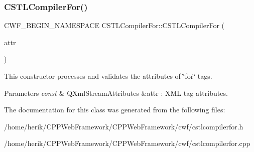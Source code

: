 \subsubsection{\texorpdfstring{C\+S\+T\+L\+Compiler\+For()}{CSTLCompilerFor()}}
{\footnotesize\ttfamily C\+W\+F\+\_\+\+B\+E\+G\+I\+N\+\_\+\+N\+A\+M\+E\+S\+P\+A\+CE C\+S\+T\+L\+Compiler\+For\+::\+C\+S\+T\+L\+Compiler\+For (\begin{DoxyParamCaption}\item[{const Q\+Xml\+Stream\+Attributes \&}]{attr }\end{DoxyParamCaption})\hspace{0.3cm}{\ttfamily [explicit]}}



This constructor processes and validates the attributes of \char`\"{}for\char`\"{} tags. 


\begin{DoxyParams}{Parameters}
{\em const} & Q\+Xml\+Stream\+Attributes \&attr \+: X\+ML tag attributes. \\
\hline
\end{DoxyParams}


The documentation for this class was generated from the following files\+:\begin{DoxyCompactItemize}
\item 
/home/herik/\+C\+P\+P\+Web\+Framework/\+C\+P\+P\+Web\+Framework/cwf/cstlcompilerfor.\+h\item 
/home/herik/\+C\+P\+P\+Web\+Framework/\+C\+P\+P\+Web\+Framework/cwf/cstlcompilerfor.\+cpp\end{DoxyCompactItemize}
